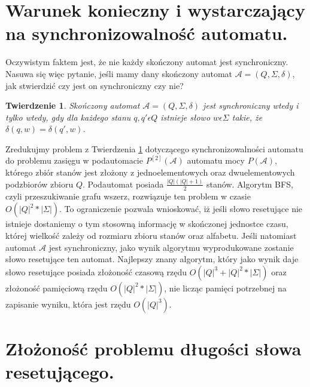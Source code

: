\documentclass[12pt,a4paper]{article}
\newtheorem{twr}{Twierdzenie}[section]
\begin{document}
\newpage
\section{Warunek konieczny i wystarczaj\k{a}cy na synchronizowalno\'{s}\'{c} automatu.}

Oczywistym faktem jest, \.{z}e nie ka\.{z}dy sko\'{n}czony automat jest synchroniczny. Nasuwa si\k{e} wi\k{e}c pytanie, je\'{s}li mamy dany sko\'{n}czony automat $\mathscr{A}=(Q, \Sigma, \delta)$, jak stwierdzi\'{c} czy jest on synchroniczny czy nie?

\begin{twr}
\label{tw:twierdzenie1}
Sko\'{n}czony automat $\mathscr{A}=(Q, \Sigma, \delta)$ jest synchroniczny wtedy i tylko wtedy, gdy dla ka\.{z}dego stanu $q, q' \epsilon Q$ istnieje s{\l}owo $w \epsilon \Sigma$ takie, \.{z}e $\delta(q,w)=\delta(q',w)$.
\end{twr}

Zredukujmy problem z Twierdzenia \ref{tw:twierdzenie1} dotycz\k{a}cego synchronizowalno\'{s}ci automatu do problemu zasi\k{e}gu w podautomacie $P^{[2]}(\mathscr{A})$ automatu mocy $P(\mathscr{A})$, kt\'{o}rego zbi\'{o}r stan\'{o}w jest z{\l}o\.{z}ony z jednoelementowych oraz dwuelementowych podzbior\'{o}w zbioru $Q$. Podautomat posiada $\frac{|Q|(|Q|+1)}{2}$ stan\'{o}w. Algorytm BFS, czyli przeszukiwanie grafu wszerz, rozwi\k{a}zuje ten problem w czasie $O(|Q|^2*|\Sigma|)$. To ograniczenie pozwala wnioskowa\'{c}, i\.{z} je\'{s}li s{\l}owo resetuj\k{a}ce nie istnieje dostaniemy o tym stosown\k{a} informacj\k{e} w sko\'{n}czonej jednostce czasu, kt\'{o}rej wielko\'{s}\'{c} zale\.{z}y od rozmiaru zbioru stan\'{o}w oraz alfabetu. Je\'{s}li natomiast automat $\mathscr{A}$ jest synchroniczny, jako wynik algorytmu wyprodukowane zostanie s{\l}owo resetuj\k{a}ce ten automat. Najlepszy znany algorytm, kt\'{o}ry jako wynik daje s{\l}owo resetuj\k{a}ce posiada z{\l}o\.{z}ono\'{s}\'{c} czasow\k{a} rz\k{e}du $O(|Q|^3+|Q|^2*|\Sigma|)$ oraz z{\l}o\.{z}ono\'{s}\'{c} pami\k{e}ciow\k{a} rz\k{e}du $O(|Q|^2*|\Sigma|)$, nie licz\k{a}c pami\k{e}ci potrzebnej na zapisanie wyniku, kt\'{o}ra jest rz\k{e}du $O(|Q|^3)$.


\newpage
\section{Z{\l}o\.zono\'s\'c problemu d{\l}ugo\'{s}ci s{\l}owa resetuj\k{a}cego.}
\end{document}
